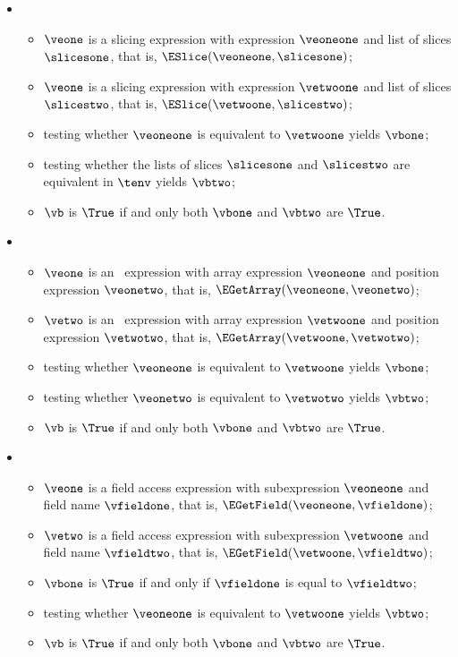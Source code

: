 \begin{itemize}
  \item {}
  \begin{itemize}
    \item $\veone$ is a slicing expression with expression $\veoneone$ and list of slices $\slicesone$,
          that is, $\ESlice(\veoneone, \slicesone)$;
    \item $\veone$ is a slicing expression with expression $\vetwoone$ and list of slices $\slicestwo$,
          that is, $\ESlice(\vetwoone, \slicestwo)$;
    \item testing whether $\veoneone$ is equivalent to $\vetwoone$ yields $\vbone$\ProseOrTypeError;
    \item testing whether the lists of slices $\slicesone$ and $\slicestwo$ are equivalent in $\tenv$ yields $\vbtwo$\ProseOrTypeError;
    \item $\vb$ is $\True$ if and only both $\vbone$ and $\vbtwo$ are $\True$.
  \end{itemize}

  \item {}
  \begin{itemize}
    \item $\veone$ is an \arrayaccessterm\ expression with array expression $\veoneone$ and position expression $\veonetwo$,
          that is, $\EGetArray(\veoneone, \veonetwo)$;
    \item $\vetwo$ is an \arrayaccessterm\ expression with array expression $\vetwoone$ and position expression $\vetwotwo$,
          that is, $\EGetArray(\vetwoone, \vetwotwo)$;
    \item testing whether $\veoneone$ is equivalent to $\vetwoone$ yields $\vbone$\ProseOrTypeError;
    \item testing whether $\veonetwo$ is equivalent to $\vetwotwo$ yields $\vbtwo$\ProseOrTypeError;
    \item $\vb$ is $\True$ if and only both $\vbone$ and $\vbtwo$ are $\True$.
  \end{itemize}

  \item {}
  \begin{itemize}
    \item $\veone$ is a field access expression with subexpression $\veoneone$ and field name $\vfieldone$,
          that is, $\EGetField(\veoneone, \vfieldone)$;
    \item $\vetwo$ is a field access expression with subexpression $\vetwoone$ and field name $\vfieldtwo$,
          that is, $\EGetField(\vetwoone, \vfieldtwo)$;
    \item $\vbone$ is $\True$ if and only if $\vfieldone$ is equal to $\vfieldtwo$;
    \item testing whether $\veoneone$ is equivalent to $\vetwoone$ yields $\vbtwo$\ProseOrTypeError;
    \item $\vb$ is $\True$ if and only both $\vbone$ and $\vbtwo$ are $\True$.
  \end{itemize}


\end{itemize}
